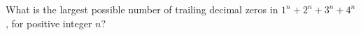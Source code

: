 What is the largest possible number of trailing decimal zeros in $1^n+2^n+3^n+4^n$, for positive integer $n$?
